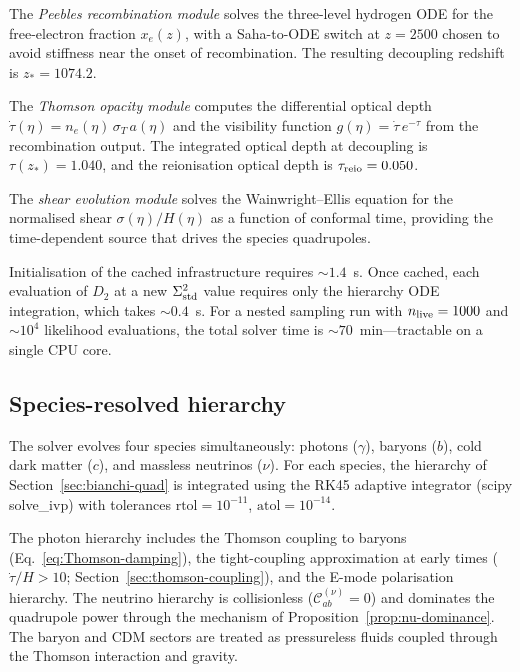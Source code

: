The \emph{Peebles recombination module} solves the three-level
hydrogen ODE for the free-electron fraction $x_e(z)$, with a
Saha-to-ODE switch at $z = 2500$ chosen to avoid stiffness near
the onset of recombination.  The resulting decoupling redshift
is $z_* = 1074.2$.

The \emph{Thomson opacity module} computes the differential
optical depth $\dot{\tau}(\eta) = n_e(\eta)\,\sigma_T\,a(\eta)$
and the visibility function $g(\eta) = \dot{\tau}\,e^{-\tau}$
from the recombination output.  The integrated optical depth at
decoupling is $\tau(z_*) = 1.040$, and the reionisation optical
depth is $\tau_{\rm reio} = 0.050$.

The \emph{shear evolution module} solves the Wainwright--Ellis
equation for the normalised shear $\sigma(\eta)/H(\eta)$ as a
function of conformal time, providing the time-dependent source
that drives the species quadrupoles.

Initialisation of the cached infrastructure requires
$\sim\!1.4$~s.  Once cached, each evaluation of $D_2$ at a new
$\Sigma^2_{\mathrm{std}}$ value requires only the hierarchy ODE integration,
which takes $\sim\!0.4$~s.  For a nested sampling run with
$n_{\rm live} = 1000$ and $\sim\!10^4$ likelihood evaluations,
the total solver time is $\sim\!70$~min---tractable on a single
CPU core.


\subsection{Species-resolved hierarchy}
\label{sec:solver-hierarchy}
\label{sec:absorbing-bc}

The solver evolves four species simultaneously: photons
($\gamma$), baryons ($b$), cold dark matter ($c$), and
massless neutrinos ($\nu$).  For each species, the hierarchy
of Section~\ref{sec:bianchi-quad} is integrated using the
RK45 adaptive integrator (scipy {\ttfamily solve\_ivp}) with
tolerances $\mathrm{rtol} = 10^{-11}$,
$\mathrm{atol} = 10^{-14}$.

The photon hierarchy includes the Thomson coupling to baryons
(Eq.~\ref{eq:Thomson-damping}), the tight-coupling
approximation at early times ($\dot{\tau}/H > 10$;
Section~\ref{sec:thomson-coupling}), and the E-mode
polarisation hierarchy.  The neutrino hierarchy is
collisionless ($\mathcal{C}^{(\nu)}_{ab} = 0$) and dominates
the quadrupole power through the mechanism of
Proposition~\ref{prop:nu-dominance}.  The baryon and CDM
sectors are treated as pressureless fluids coupled through the
Thomson interaction and gravity.

